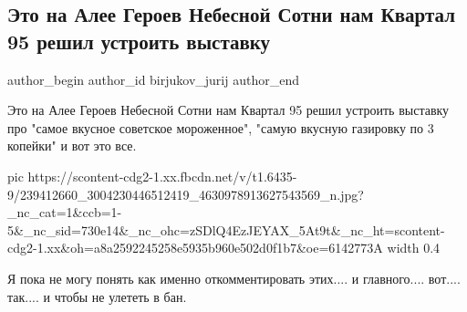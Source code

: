  
 
 
 
 
 
\subsection{Это на Алее Героев Небесной Сотни нам Квартал 95 решил устроить выставку}
\label{sec:17_08_2021.fb.birjukov_jurij.1.vystavka_alleja}
 
\ifcmt
 author_begin
   author_id birjukov_jurij
 author_end
\fi

Это на Алее Героев Небесной Сотни нам Квартал 95 решил устроить выставку про
"самое вкусное советское мороженное", "самую вкусную газировку по 3 копейки" и
вот это все.

\ifcmt
  pic https://scontent-cdg2-1.xx.fbcdn.net/v/t1.6435-9/239412660_3004230446512419_4630978913627543569_n.jpg?_nc_cat=1&ccb=1-5&_nc_sid=730e14&_nc_ohc=zSDlQ4EzJEYAX_5At9t&_nc_ht=scontent-cdg2-1.xx&oh=a8a2592245258e5935b960e502d0f1b7&oe=6142773A
  width 0.4
\fi

Я пока не могу понять как именно откомментировать этих.... и главного....
вот.... так.... и чтобы не улететь в бан.


